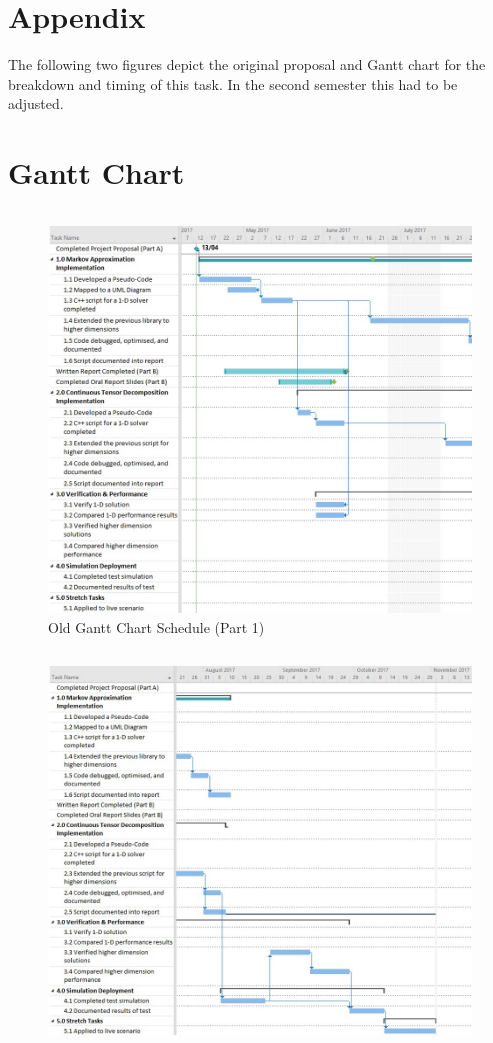 \documentclass[11pt,draftd]{article}
\begin{document}
\section{Appendix}
\begin{appendices}
	The following two figures depict the original proposal and Gantt chart for the breakdown and timing of this task. In the second semester this had to be adjusted.
	\section{Gantt Chart}\label{app_itemA}
	\[\]
	\[\]
	\[\]
	\begin{figure}[h]
		\centering
		\includegraphics[scale=.6]{OldGanttPart1}
		\caption{Old Gantt Chart Schedule (Part 1)}
	\end{figure}
	\newpage
	\[\]
	\[\]
	\[\]
	\begin{figure}[h]
		\centering
		\includegraphics[scale=.6]{OldGanttPart2}

\end{figure}
\end{appendices}
\end{document}
